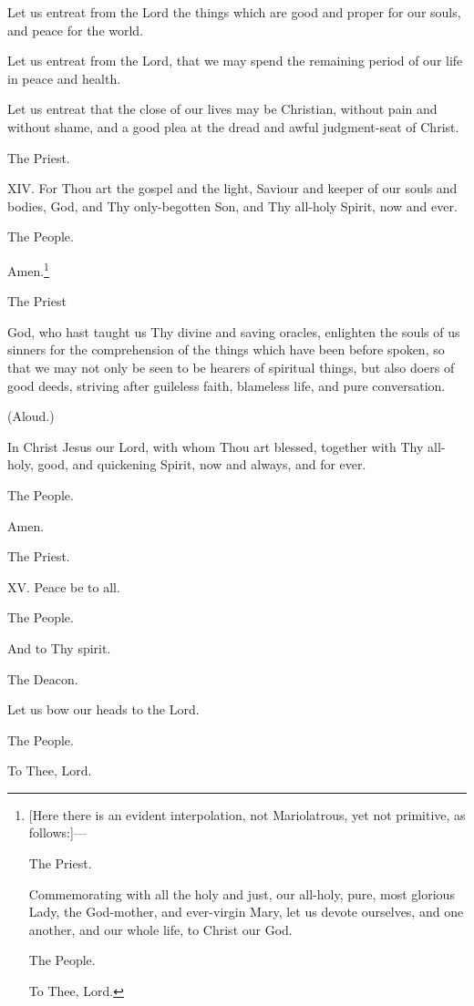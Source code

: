 Let us entreat from the Lord the things which are good and proper for our souls, and peace for the world.

Let us entreat from the Lord, that we may spend the remaining period of our life in peace and health.

Let us entreat that the close of our lives may be Christian, without pain and without shame, and a good plea at the dread and awful judgment-seat of Christ.

The Priest.

XIV. For Thou art the gospel and the light, Saviour and keeper of our souls and bodies, God, and Thy only-begotten Son, and Thy all-holy Spirit, now and ever.

The People.

Amen.\footnote{\par{}  [Here there is an evident interpolation, not Mariolatrous, yet not primitive, as follows:]—  \par The Priest.   \par Commemorating with all the holy and just, our all-holy, pure, most glorious Lady, the God-mother, and ever-virgin Mary, let us devote ourselves, and one another, and our whole life, to Christ our God.  \par The People.   \par To Thee, Lord.}

The Priest

God, who hast taught us Thy divine and saving oracles, enlighten the souls of us sinners for the comprehension of the things which have been before spoken, so that we may not only be seen to be hearers of spiritual things, but also doers of good deeds, striving after guileless faith, blameless life, and pure conversation.

(Aloud.)

In Christ Jesus our Lord, with whom Thou art blessed, together with Thy all-holy, good, and quickening Spirit, now and always, and for ever.

The People.

Amen.

The Priest.

XV. Peace be to all.

The People.

And to Thy spirit.

The Deacon.

Let us bow our heads to the Lord.

The People.

To Thee, Lord.

